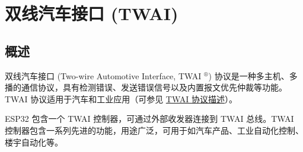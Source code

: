 \documentclass[main\_\_CN.tex]{subfiles}
\begin{document}
\setchineseformatting


\ifglobal
\else
    \listoftodos
    {\let\clearpage\relax \listofdonetodos}
    \tableofcontents
\fi



\hypertarget{twai}{}
\chapter{双线汽车接口 (TWAI)}
\label{mod:twai}

\section{概述}

双线汽车接口 (Two-wire Automotive Interface, TWAI $^\circledR$) 协议是一种多主机、多播的通信协议，具有检测错误、发送错误信号以及内置报文优先仲裁等功能。TWAI 协议适用于汽车和工业应用（可参见 \hyperref[subsec:protocol-description]{TWAI 协议描述}）。

ESP32 包含一个 TWAI 控制器，可通过外部收发器连接到 TWAI 总线。TWAI 控制器包含一系列先进的功能，用途广泛，可用于如汽车产品、工业自动化控制、楼宇自动化等。
\end{document}
